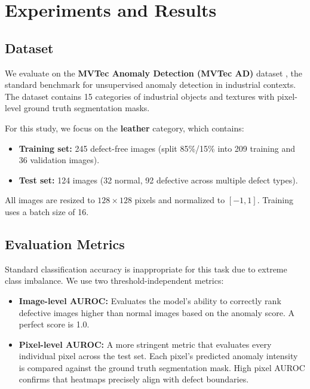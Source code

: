 \documentclass{article}
\begin{document}
\section{Experiments and Results}

\subsection{Dataset}

We evaluate on the \textbf{MVTec Anomaly Detection (MVTec AD)} dataset \citep{bergmann2019mvtec}, the standard benchmark for unsupervised anomaly detection in industrial contexts. The dataset contains 15 categories of industrial objects and textures with pixel-level ground truth segmentation masks.

For this study, we focus on the \textbf{leather} category, which contains:
\begin{itemize}
    \item \textbf{Training set:} 245 defect-free images (split 85\%/15\% into 209 training and 36 validation images).
    \item \textbf{Test set:} 124 images (32 normal, 92 defective across multiple defect types).
\end{itemize}

All images are resized to $128 \times 128$ pixels and normalized to $[-1, 1]$. Training uses a batch size of 16.

\subsection{Evaluation Metrics}

Standard classification accuracy is inappropriate for this task due to extreme class imbalance. We use two threshold-independent metrics:

\begin{itemize}
    \item \textbf{Image-level AUROC:} Evaluates the model's ability to correctly rank defective images higher than normal images based on the anomaly score. A perfect score is 1.0.
    \item \textbf{Pixel-level AUROC:} A more stringent metric that evaluates every individual pixel across the test set. Each pixel's predicted anomaly intensity is compared against the ground truth segmentation mask. High pixel AUROC confirms that heatmaps precisely align with defect boundaries.
\end{itemize}
\end{document}
